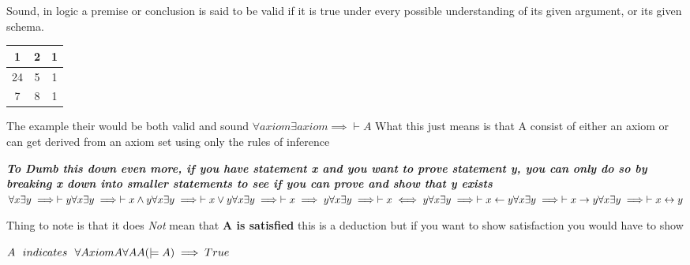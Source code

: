 \documentclass{article}
\theoremstyle{mytheoremstyle}
\theoremstyle{mytheoremstyle}
\theoremstyle{myproblemstyle}
\begin{document}
\begin{definition}
    Sound, in logic a premise or conclusion is said to be valid if it is true under every possible understanding of its given argument, or its given schema.
        \begin{center}
          \begin{tabular}{ c c c }
            1 & 2 & 1 \\
            \hline
            24 & 5 & 1  \\
            \hline
            7 & 8 & 1
          \end{tabular}
        \end{center}

        The example their would be both valid and sound
        \begin{math}
            \forall axiom \exists axiom \implies \vdash A
        \end{math}
        What this just means is that A consist of either an axiom or can get derived from an axiom set using only the rules of inference

        \textbf{\textit{To Dumb this down even more, if you have statement x and you want to prove statement y, you can only do so by breaking x down into smaller statements to see if you can prove and show that y exists}}
        \\
        \begin{math}
            \forall x \exists y \implies \vdash y  \\
            \forall x \exists y \implies \vdash x \land y \\
            \forall x \exists y \implies \vdash x \lor y \\
            \forall x \exists y \implies \vdash x \implies y \\
            \forall x \exists y \implies \vdash x \iff y \\
            \forall x \exists y \implies \vdash x \leftarrow y \\
            \forall x \exists y \implies \vdash x \rightarrow y \\
            \forall x \exists y \implies \vdash x \leftrightarrow y \\
        \end{math}

        Thing to note is that it does \textit{Not} mean that \textbf{A is satisfied} this is a deduction but if you want to show satisfaction you would have to show

        \begin{math}
            A \ \ indicates \ \ \forall Axiom A \\
            \forall A A(\models A) \implies True
        \end{math}

\end{definition}
\end{document}

